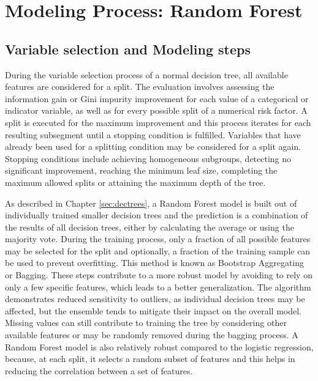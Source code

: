 \section{Modeling Process: Random Forest}

\subsection{Variable selection and Modeling steps}

During the variable selection process of a normal decision tree, all available features are considered for a split. The evaluation involves assessing  the information gain or Gini impurity improvement for each value of a categorical or indicator variable, as well as for every possible split of a numerical risk factor. A split is executed for the maximum improvement and this process iterates for each resulting subsegment until a stopping condition is fulfilled. Variables that have already been used for a splitting condition may be considered for a split again. Stopping conditions include achieving homogeneous subgroups, detecting no significant improvement, reaching the minimum leaf size, completing the maximum allowed splits or attaining the maximum depth of the tree. \cite[pp.~2,4]{BDT}

As described in Chapter \ref{sec:dectrees}, a Random Forest model is built out of individually trained smaller decision trees and the prediction is a combination of the results of all decision trees, either by calculating the average or using the majority vote. During the training process, only a fraction of all possible features may be selected for the split and optionally, a fraction of the training sample can be used to prevent overfitting. This method is known as Bootstrap Aggregating or Bagging. These steps contribute to a more robust model by avoiding to rely on only a few specific features, which leads to a better generalization. The algorithm demonstrates reduced sensitivity to outliers, as individual decision trees may be affected, but the ensemble tends to mitigate their impact on the overall model. Missing values can still contribute to training the tree by considering other available features or may be randomly removed during the bagging process. A Random Forest model is also relatively robust compared to the logistic regression, because, at each split, it selects a random subset of features and this helps in reducing the correlation between a set of features. \cite{RanFor:2023} 

